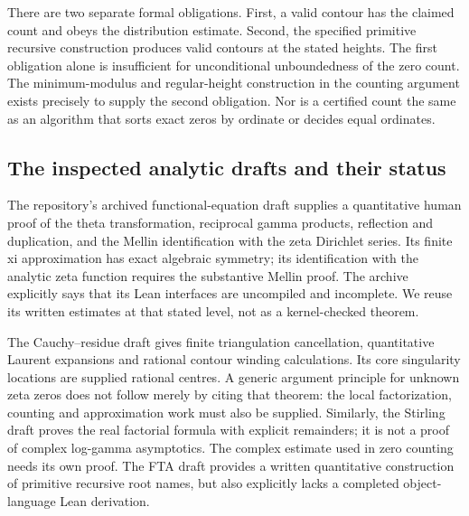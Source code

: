 There are two separate formal obligations. First, a valid contour has the
claimed count and obeys the distribution estimate. Second, the specified
primitive recursive construction produces valid contours at the stated
heights. The first obligation alone is insufficient for unconditional
unboundedness of the zero count. The minimum-modulus and regular-height
construction in the counting argument exists precisely to supply the
second obligation. Nor is a certified count the same as an algorithm that
sorts exact zeros by ordinate or decides equal ordinates.

\subsection{The inspected analytic drafts and their status}
The repository's archived functional-equation draft supplies a quantitative
human proof of the theta transformation, reciprocal gamma products,
reflection and duplication, and the Mellin identification with the zeta
Dirichlet series. Its finite xi approximation has exact algebraic symmetry;
its identification with the analytic zeta function requires the substantive
Mellin proof. The archive explicitly says that its Lean interfaces are
uncompiled and incomplete. We reuse its written estimates at that stated
level, not as a kernel-checked theorem.

The Cauchy--residue draft gives finite triangulation cancellation,
quantitative Laurent expansions and rational contour winding calculations.
Its core singularity locations are supplied rational centres. A generic
argument principle for unknown zeta zeros does not follow merely by citing
that theorem: the local factorization, counting and approximation work
must also be supplied. Similarly, the Stirling draft proves the real
factorial formula with explicit remainders; it is not a proof of complex
log-gamma asymptotics. The complex estimate used in zero counting needs its
own proof. The FTA draft provides a written quantitative construction of
primitive recursive root names, but also explicitly lacks a completed
object-language Lean derivation.

